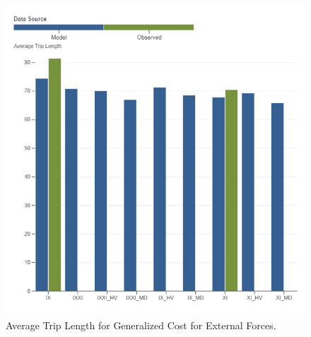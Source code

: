 \documentclass[
  letterpaper,
  DIV=11,
  numbers=noendperiod]{scrreprt}
\begin{document}
\begin{figure}[H]

{\centering \includegraphics[width=\textwidth,height=0.4\textheight]{v9x/v900/validation/_pictures/5-plot2.png}

}

\caption{\label{fig-pdf-gc-ext}Average Trip Length for Generalized Cost
for External Forces.}

\end{figure}
\end{document}
